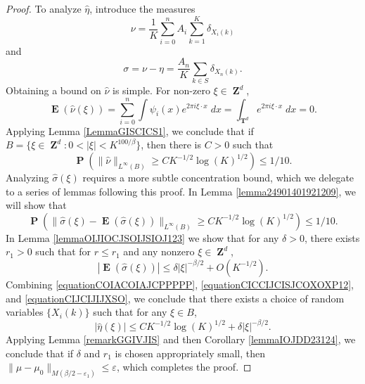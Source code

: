 \documentclass[12pt,reqno]{article}
\numberwithin{equation}{section}
\DeclareMathOperator{\ZZ}{\mathbf{Z}}
\DeclareMathOperator{\TT}{\mathbf{T}}
\numberwithin{theorem}{section}
\DeclareMathOperator{\EE}{\mathbf{E}}
\DeclareMathOperator{\PP}{\mathbf{P}}
\begin{document}
\begin{proof}
    To analyze $\widehat{\eta}$, introduce the measures
    \[ \nu = \frac{1}{K} \sum_{i = 0}^n A_i \sum_{k = 1}^K \delta_{X_i(k)} \]
    and
    \[ \sigma = \nu - \eta = \frac{A_n}{K} \sum_{k \in S} \delta_{X_n(k)}. \]
    Obtaining a bound on $\widehat{\nu}$ is simple. For non-zero $\xi \in \ZZ^d$,
    \begin{equation}
        \EE(\widehat{\nu}(\xi)) = \sum_{i = 0}^n \int \psi_i(x) e^{2 \pi i \xi \cdot x}\; dx = \int_{\TT^d} e^{2 \pi i \xi \cdot x}\; dx = 0.
    \end{equation}
    Applying Lemma \ref{LemmaGISCICS1}, we conclude that if $B = \{ \xi \in \ZZ^d: 0 < |\xi| < K^{100/\beta} \}$, then there is $C > 0$ such that
    \begin{equation} \label{equationCOIACOIAJCPPPPP}
        \PP \left( \| \widehat{\nu} \|_{L^\infty(B)} \geq C K^{-1/2} \log(K)^{1/2} \right) \leq 1/10.
    \end{equation}
    Analyzing $\widehat{\sigma}(\xi)$ requires a more subtle concentration bound, which we delegate to a series of lemmas following this proof. In Lemma \ref{lemma24901401921209}, we will show that
    \begin{equation} \label{equationCICCIJCISJCOXOXP12}
        \PP \left( \| \widehat{\sigma}(\xi) - \EE(\widehat{\sigma}(\xi)) \|_{L^\infty(B)} \geq C K^{-1/2} \log(K)^{1/2} \right) \leq 1/10.
    \end{equation}
    In Lemma \ref{lemmaOIJIOCJSOIJSIOJ123} we show that for any $\delta > 0$, there exists $r_1 > 0$ such that for $r \leq r_1$ and any nonzero $\xi \in \ZZ^d$,
    \begin{equation} \label{equationCIJCIJIJXSO}
        |\EE(\widehat{\sigma}(\xi))| \leq \delta |\xi|^{-\beta/2} + O(K^{-1/2}).
    \end{equation}
    Combining \eqref{equationCOIACOIAJCPPPPP}, \eqref{equationCICCIJCISJCOXOXP12}, and \eqref{equationCIJCIJIJXSO}, we conclude that there exists a choice of random variables $\{ X_i(k) \}$ such that for any $\xi \in B$,
    \begin{equation}
        |\widehat{\eta}(\xi)| \leq C K^{-1/2} \log(K)^{1/2} + \delta |\xi|^{-\beta/2}.
    \end{equation}
    Applying Lemma \ref{remarkGGIVJIS} and then Corollary \ref{lemmaIOJDD23124}, we conclude that if $\delta$ and $r_1$ is chosen appropriately small, then $\| \mu - \mu_0 \|_{M(\beta/2 - \varepsilon_1)} \leq \varepsilon$, which completes the proof.
\end{proof}
\end{document}
